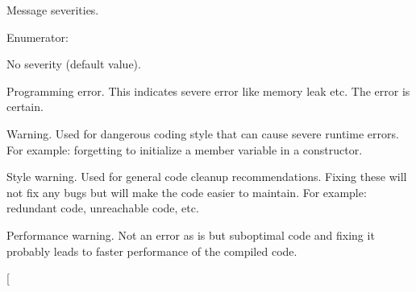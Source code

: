Message severities. \begin{Desc}
\item[Enumerator\-: ]\par
\begin{description}
\item[{\em 
\hypertarget{class_severity_ac185938ae084355bbf1790cf1a70caa6ad4f4cb9fe0113d7830e57fe3bc1cadf6}{none}\label{class_severity_ac185938ae084355bbf1790cf1a70caa6ad4f4cb9fe0113d7830e57fe3bc1cadf6}
}]No severity (default value). \item[{\em 
\hypertarget{class_severity_ac185938ae084355bbf1790cf1a70caa6ae24df992f36773de88bd9d04501e2a22}{error}\label{class_severity_ac185938ae084355bbf1790cf1a70caa6ae24df992f36773de88bd9d04501e2a22}
}]Programming error. This indicates severe error like memory leak etc. The error is certain. \item[{\em 
\hypertarget{class_severity_ac185938ae084355bbf1790cf1a70caa6a09546b0bdebb1927e354943d76d1ece3}{warning}\label{class_severity_ac185938ae084355bbf1790cf1a70caa6a09546b0bdebb1927e354943d76d1ece3}
}]Warning. Used for dangerous coding style that can cause severe runtime errors. For example\-: forgetting to initialize a member variable in a constructor. \item[{\em 
\hypertarget{class_severity_ac185938ae084355bbf1790cf1a70caa6af063007296e71e4676ed95c8c8688464}{style}\label{class_severity_ac185938ae084355bbf1790cf1a70caa6af063007296e71e4676ed95c8c8688464}
}]Style warning. Used for general code cleanup recommendations. Fixing these will not fix any bugs but will make the code easier to maintain. For example\-: redundant code, unreachable code, etc. \item[{\em 
\hypertarget{class_severity_ac185938ae084355bbf1790cf1a70caa6a1e26a833c74f1b8573c51f19339671d2}{performance}\label{class_severity_ac185938ae084355bbf1790cf1a70caa6a1e26a833c74f1b8573c51f19339671d2}
}]Performance warning. Not an error as is but suboptimal code and fixing it probably leads to faster performance of the compiled code. \item[{\em 
}
\end{description}
\end{Desc}
